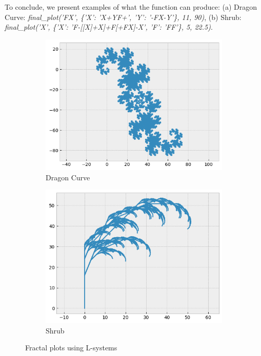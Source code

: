 \documentclass[a4paper,11pt, titlepage]{article}
\theoremstyle{definition}
\theoremstyle{plain}
\theoremstyle{remark}
\theoremstyle{definition}
\begin{document}
To conclude, we present examples of what the function can produce: (a) Dragon Curve: \textit{final\_plot('FX', \{'X': 'X+YF+', 'Y': '-FX-Y'\}, 11, 90)}, (b) Shrub: \textit{final\_plot('X', \{'X': 'F-[[X]+X]+F[+FX]-X', 'F': 'FF'\}, 5, 22.5)}.

\begin{figure}[h]
    \centering
    \begin{subfigure}[b]{0.48\textwidth}
        \centering
        \includegraphics[width=\textwidth]{pic5.png}
        \caption{Dragon Curve}
        \label{fig:image1}
    \end{subfigure}%
    \hfill
    \begin{subfigure}[b]{0.48\textwidth}
        \centering
        \includegraphics[width=\textwidth]{pic6.png}
        \caption{Shrub}
        \label{fig:image2}
    \end{subfigure}
    \caption{Fractal plots using L-systems}
    \label{fig:main}
\end{figure}
\end{document}
